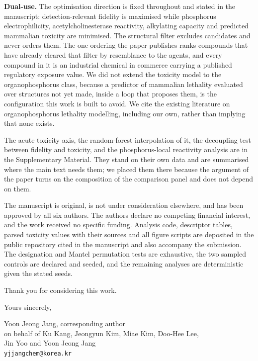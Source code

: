 \documentclass[11pt,a4paper]{article}
\begin{document}
\textbf{Dual-use.} The optimisation direction is fixed throughout and stated in
the manuscript: detection-relevant fidelity is maximised while phosphorus
electrophilicity, acetylcholinesterase reactivity, alkylating capacity and
predicted mammalian toxicity are minimised. The structural filter excludes
candidates and never orders them. The one ordering the paper publishes ranks
compounds that have already cleared that filter by resemblance to the agents,
and every compound in it is an industrial chemical in commerce carrying a
published regulatory exposure value. We did not extend the toxicity model to the
organophosphorus class, because a predictor of mammalian lethality evaluated over
structures not yet made, inside a loop that proposes them, is the configuration
this work is built to avoid. We cite the existing literature on organophosphorus
lethality modelling, including our own, rather than implying that none exists.

The acute toxicity axis, the random-forest interpolation of it, the decoupling
test between fidelity and toxicity, and the phosphorus-local reactivity analysis
are in the Supplementary Material. They stand on their own data and are
summarised where the main text needs them; we placed them there because the
argument of the paper turns on the composition of the comparison panel and does
not depend on them.

The manuscript is original, is not under consideration elsewhere, and has been
approved by all six authors. The authors declare no competing financial interest,
and the work received no specific funding. Analysis code, descriptor tables,
parsed toxicity values with their sources and all figure scripts are deposited in
the public repository cited in the manuscript and also accompany the submission.
The designation and Mantel permutation tests are exhaustive, the two
sampled controls are declared and seeded, and the remaining analyses are
deterministic given the stated seeds.

Thank you for considering this work.

\vspace{10pt}

Yours sincerely,

\vspace{14pt}

Yoon Jeong Jang, corresponding author\\
on behalf of Ku Kang, Jeongyun Kim, Miae Kim, Doo-Hee Lee,\\
Jin Yoo and Yoon Jeong Jang\\
\texttt{yjjangchem@korea.kr}

\end{document}
